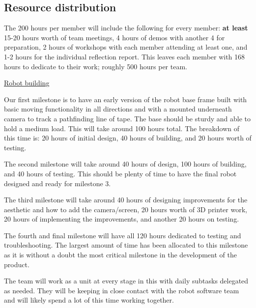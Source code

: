 \documentclass{article}
\begin{document}
\subsection{Resource distribution}

The 200 hours per member will include the following for every member: {\bf at least} 15-20 hours worth of team meetings, 4 hours of demos with another 4 for preparation, 2 hours of workshops with each member attending at least one, and 1-2 hours for the individual reflection report. This leaves each member with 168 hours to dedicate to their work; roughly 500 hours per team. 


\underline{Robot building} 

Our first milestone is to have an early version of the robot base frame built with basic moving functionality in all directions and with a mounted underneath camera to track a pathfinding line of tape. The base should be sturdy and able to hold a medium load. This will take around 100 hours total. The breakdown of this time is: 20 hours of initial design, 40 hours of building, and 20 hours worth of testing.  

The second milestone will take around 40 hours of design, 100 hours of building, and 40 hours of testing. This should be plenty of time to have the final robot designed and ready for milestone 3.

The third milestone will take around 40 hours of designing improvements for the aesthetic and how to add the camera/screen, 20 hours worth of 3D printer work, 20 hours of implementing the improvements, and another 20 hours on testing.

The fourth and final milestone will have all 120 hours dedicated to testing and troubleshooting. The largest amount of time has been allocated to this milestone as it is without a doubt the most critical milestone in the development of the product.

The team will work as a unit at every stage in this with daily subtasks delegated as needed. They will be keeping in close contact with the robot software team and will likely spend a lot of this time working together.
\end{document}
